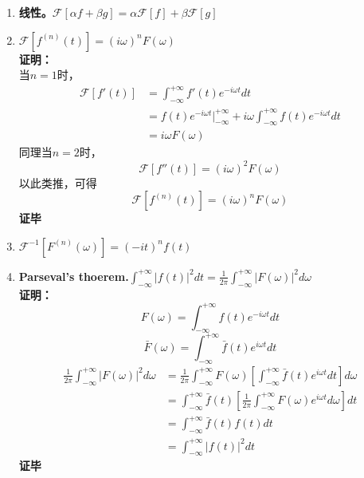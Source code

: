 	\begin{enumerate}
		\item \textbf{线性。$\mathcal{F}[\alpha f+\beta g]=\alpha\mathcal{F}[f]+\beta\mathcal{F}[g]$}
		
		\item \textbf{$\mathcal{F}[f^{(n)}(t)]=(i\omega)^nF(\omega)$}	\\
		\textbf{证明：}	\\
		当$n=1$时，
		\begin{equation}
		\begin{aligned}
			\mathcal{F}[f'(t)]
			&=\int_{-\infty}^{+\infty}f'(t)e^{-i\omega t}dt	\\
			&=f(t)e^{-i\omega t}|_{-\infty}^{+\infty}+i\omega \int_{-\infty}^{+\infty}f(t)e^{-i\omega t}dt	\\
			&=i\omega F(\omega)
		\end{aligned}
		\end{equation}
		同理当$n=2$时，
		$$
			\mathcal{F}[f''(t)]=(i\omega)^2 F(\omega)
		$$
		以此类推，可得
		$$
			\mathcal{F}[f^{(n)}(t)]=(i\omega)^nF(\omega)
		$$
		\hfill{\textbf{证毕}}
		
		\item \textbf{$\mathcal{F}^{-1}[F^{(n)}(\omega)]=(-it)^nf(t)$}
		
		\item \textbf{Parseval's thoerem.$\int_{-\infty}^{+\infty}|f(t)|^2dt=\frac{1}{2\pi}\int_{-\infty}^{+\infty}|F(\omega)|^2d\omega$}	\\
		\textbf{证明：}	\\
		$$
			F(\omega)=\int_{-\infty}^{+\infty}f(t)e^{-i\omega t}dt
		$$
		$$
			\bar{F}(\omega)=\int_{-\infty}^{+\infty}\bar{f}(t)e^{i\omega t}dt
		$$
		\begin{equation}
		\begin{aligned}
			\frac{1}{2\pi}\int_{-\infty}^{+\infty}|F(\omega)|^2d\omega
			&=\frac{1}{2\pi}\int_{-\infty}^{+\infty}F(\omega)[\int_{-\infty}^{+\infty}\bar{f}(t)e^{i\omega t}dt]d\omega	\\
			&=\int_{-\infty}^{+\infty}\bar{f}(t)[\frac{1}{2\pi}\int_{-\infty}^{+\infty}F(\omega)e^{i\omega t}d\omega]dt	\\
			&=\int_{-\infty}^{+\infty}\bar{f}(t)f(t)dt	\\
			&=\int_{-\infty}^{+\infty}|f(t)|^2dt
		\end{aligned}
		\end{equation}
		\hfill{\textbf{证毕}}
		

\end{enumerate}
